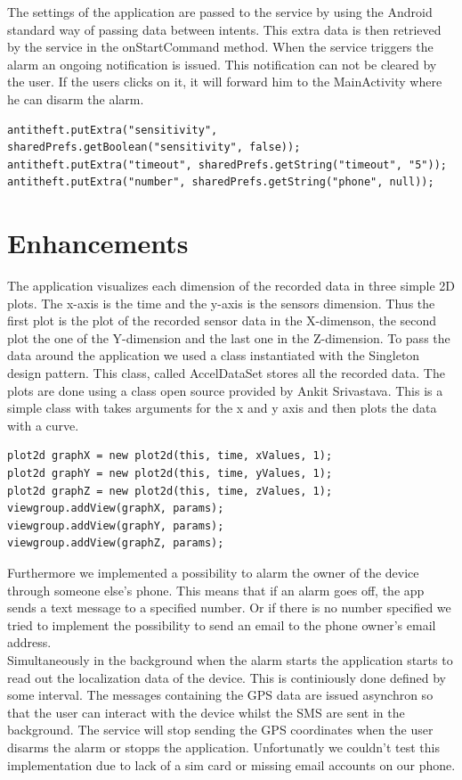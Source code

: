 \documentclass{report}
\begin{document}
The settings of the application are passed to the service by using the Android standard way of passing data between intents. This extra data is then retrieved by the service in the onStartCommand method. When the service triggers the alarm an ongoing notification is issued. This notification can not be cleared by the user. If the users clicks on it, it will forward him to the MainActivity where he can disarm the alarm.

\begin{lstlisting}
antitheft.putExtra("sensitivity", sharedPrefs.getBoolean("sensitivity", false));
antitheft.putExtra("timeout", sharedPrefs.getString("timeout", "5"));
antitheft.putExtra("number", sharedPrefs.getString("phone", null));
\end{lstlisting}

\section{Enhancements}

The application visualizes each dimension of the recorded data in three simple 2D plots. The x-axis is the time and the y-axis is the sensors dimension. Thus the first plot is the plot of the recorded sensor data in the X-dimenson, the second plot the one of the Y-dimension and the last one in the Z-dimension. To pass the data around the application we used a class instantiated with the Singleton design pattern. This class, called AccelDataSet stores all the recorded data. The plots are done using a class open source provided by Ankit Srivastava\cite{androidplot}. This is a simple class with takes arguments for the x and y axis and then plots the data with a curve.

\begin{lstlisting}
plot2d graphX = new plot2d(this, time, xValues, 1);
plot2d graphY = new plot2d(this, time, yValues, 1);
plot2d graphZ = new plot2d(this, time, zValues, 1);
viewgroup.addView(graphX, params);
viewgroup.addView(graphY, params);
viewgroup.addView(graphZ, params);
\end{lstlisting}

Furthermore we implemented a possibility to alarm the owner of the device through someone else's phone. This means that if an alarm goes off, the app sends a text message to a specified number. Or if there is no number specified we tried to implement the possibility to send an email to the phone owner's email address. \\
Simultaneously in the background when the alarm starts the application starts to read out the localization data of the device. This is continiously done defined by some interval. The messages containing the GPS data are issued asynchron so that the user can interact with the device whilst the SMS are sent in the background. The service will stop sending the GPS coordinates when the user disarms the alarm or stopps the application. Unfortunatly we couldn't test this implementation due to lack of a sim card or missing email accounts on our phone.
\end{document}
